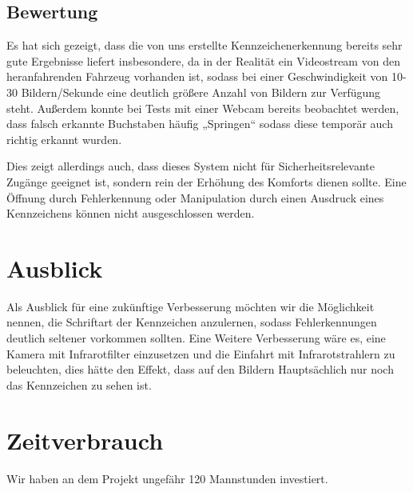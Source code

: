 \documentclass{../Vorlage/sebDenCls}
\begin{document}
\subsection{Bewertung}
Es hat sich gezeigt, dass die von uns erstellte Kennzeichenerkennung bereits sehr gute Ergebnisse liefert insbesondere, da in der Realität ein Videostream von den heranfahrenden Fahrzeug vorhanden ist, sodass bei einer Geschwindigkeit von 10-30 Bildern/Sekunde eine deutlich größere Anzahl von Bildern zur Verfügung steht. Außerdem konnte bei Tests mit einer Webcam bereits beobachtet werden, dass falsch erkannte Buchstaben häufig „Springen“ sodass diese temporär auch richtig erkannt wurden. 

Dies zeigt allerdings auch, dass dieses System nicht für Sicherheitsrelevante Zugänge geeignet ist, sondern rein der Erhöhung des Komforts dienen sollte. Eine Öffnung durch Fehlerkennung oder Manipulation durch einen Ausdruck eines Kennzeichens können nicht ausgeschlossen werden.
\section{Ausblick}
Als Ausblick für eine zukünftige Verbesserung möchten wir die Möglichkeit nennen, die Schriftart der Kennzeichen anzulernen, sodass Fehlerkennungen deutlich seltener vorkommen sollten.
Eine Weitere Verbesserung wäre es, eine Kamera mit Infrarotfilter einzusetzen und die Einfahrt mit Infrarotstrahlern zu beleuchten, dies hätte den Effekt, dass auf den Bildern Hauptsächlich nur noch das Kennzeichen zu sehen ist.

\section{Zeitverbrauch}
Wir haben an dem Projekt ungefähr 120 Mannstunden investiert.
\end{document}
